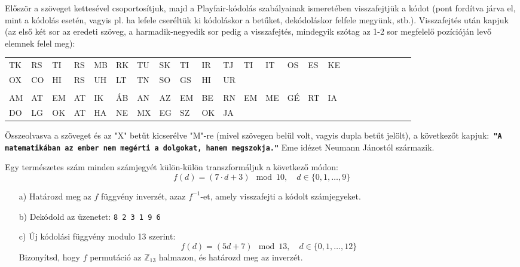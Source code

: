 \begin{solution}
Először a szöveget kettesével csoportosítjuk, majd a Playfair-kódolás
szabályainak ismeretében visszafejtjük a kódot (pont fordítva járva
el, mint a kódolás esetén, vagyis pl. ha lefele cseréltük ki kódoláskor
a betűket, dekódoláskor felfele megyünk, stb.). Visszafejtés után
kapjuk (az első két sor az eredeti szöveg, a harmadik-negyedik sor
pedig a visszafejtés, mindegyik szótag az 1-2 sor megfelelő pozícióján
levő elemnek felel meg):

\vspace{0.2cm}
\begin{center}
	
	\ttfamily
	\begin{tabular}{llllllllllllllllllllllll}
		TK  & RS   &TI    &RS    &MB    &RK    &TU    &SK    &TI  &IR &TJ  &TI    &IT    &OS    &ES    &  KE    \\
		OX &CO    &HI    &RS    &UH    &LT    &TN    & SO   &   GS & HI   &  UR    \\
		\\[6pt] %
		
		AM & AT & EM & AT & IK & ÁB & AN & AZ & EM & BE & RN & EM & ME & GÉ & RT & IA \\
		DO & LG & OK & AT & HA & NE & MX & EG & SZ & OK & JA    \\
	\end{tabular}
\end{center}
\vspace{0.2cm}
Összeolvasva a szöveget és az "X" betűt kicserélve "M"-re (mivel
szövegen belül volt, vagyis dupla betűt jelölt), a következőt kapjuk:\texttt{ }\texttt{\textbf{"A
matematikában az ember nem megérti a dolgokat, hanem megszokja."}}
Eme idézet Neumann Jánostól származik.
\end{solution}
\begin{extraproblem}
Egy természetes szám minden számjegyét külön-külön transzformáljuk
a következő módon: 
\[
f(d)=(7\cdot d+3)\mod 10,\quad d\in\{0,1,\dots,9\}
\]
\begin{itemize}
\item[a)] Határozd meg az $f$ függvény inverzét, azaz $f^{-1}$-et, amely
visszafejti a kódolt számjegyeket. 
\item[b)] Dekódold az üzenetet: \quad{}\texttt{8 2 3 1 9 6} 
\item[c)] Új kódolási függvény modulo 13 szerint: 
\[
f(d)=(5d+7)\mod{13},\quad d\in\{0,1,\dots,12\}
\]
Bizonyítsd, hogy $f$ permutáció az $\mathbb{Z}_{13}$ halmazon, és
határozd meg az inverzét. 
\end{itemize}
\end{extraproblem}


